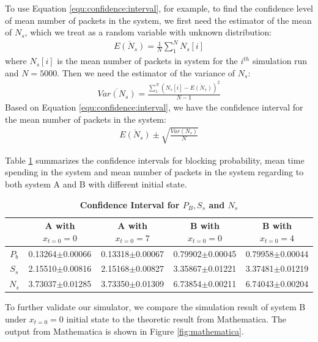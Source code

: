 \documentclass[12pt]{article}  %
\theoremstyle{definition}
\theoremstyle{remark}
\begin{document}
To use Equation \ref{equ:confidence:interval}, for example,
to find the confidence level of mean number of packets in the system, we first need the estimator of the mean of $N_s$, which we treat as a random variable with unknown distribution:
\begin{align}
        \label{equ:estimate:mean:Ns}
        \overline{E(N_s)} = \frac{1}{N}\sum_{1}^{N}N_s[i]
\end{align}
where $N_s[i]$ is the mean number of packets in system for the $i^{th}$ simulation run and $N=5000$.
Then we need the estimator of the variance of $N_s$:
\begin{align}
        \label{equ:estimate:var:Ns}
        \overline{Var(N_s)} = \frac{\sum_{1}^{N}(N_s[i]-\overline{E(N_s)})^2}{N-1}
\end{align}
Based on Equation \ref{equ:confidence:interval}, we have the confidence interval for the mean number of packets in the system:
\begin{align}
        \label{equ:confidence:interval:Ns}
        \overline{E(N_s)} \pm \sqrt{\frac{Var(N_s)}{N}}
\end{align}

Table \ref{tab:confidence:interval} summarizes the confidence intervals for blocking probability, mean time spending in the system and mean number of packets in the system regarding to both system A and B with different initial state.

\begin{table}
\caption{\textbf{Confidence Interval for $P_B,S_s$ and $N_s$}}
\begin{tabular}[b]{ccccc}
\hline
 & A with $x_{t=0}=0$ & A with $x_{t=0}=7$ & B with $x_{t=0}=0$ & B with $x_{t=0}=4$ \\
\hline
\hline
$P_b$ & 0.13264$\pm$0.00066 & 0.13318$\pm$0.00067 & 0.79902$\pm$0.00045 & 0.79958$\pm$0.00044 \\
\hline
$S_s$ & 2.15510$\pm$0.00816 & 2.15168$\pm$0.00827 & 3.35867$\pm$0.01221 & 3.37481$\pm$0.01219 \\
\hline
$N_s$ & 3.73037$\pm$0.01285 & 3.73350$\pm$0.01309 & 6.73854$\pm$0.00211 & 6.74043$\pm$0.00204 \\
\hline
\end{tabular}
\label{tab:confidence:interval}
\end{table}

To further validate our simulator, we compare the simulation result of system B under $x_{t=0}=0$ initial state to the theoretic result from Mathematica.
The output from Mathematica is shown in Figure \ref{fig:mathematica}.
\end{document}
